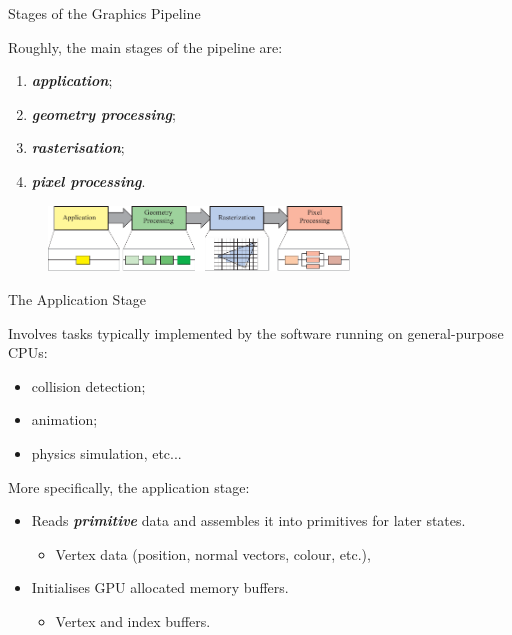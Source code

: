 \documentclass{beamer}
\newcommand{\emphbf}[1]{\textbf{\emph{#1}}}
\begin{document}
\begin{frame}{Stages of the Graphics Pipeline}

	Roughly, the main stages of the pipeline are:

	\begin{enumerate}
		\item \emphbf{application};
		\item \emphbf{geometry processing};
		\item \emphbf{rasterisation};
		\item \emphbf{pixel processing}.
	\end{enumerate}

	\vskip 1cm

	\begin{figure}[t]
		\includegraphics[width=8cm]{main-pipeline}
		\centering
	\end{figure}

\end{frame}

\begin{frame}{The Application Stage}

	Involves tasks typically implemented by the software running on general-purpose CPUs:

	\begin{itemize}
		\item collision detection;
		\item animation;
		\item physics simulation, etc...
	\end{itemize}

	\vskip 1cm

	More specifically, the application stage:

	\begin{itemize}
		\item Reads \emphbf{primitive} data and assembles it into primitives for later states.
		\begin{itemize}
			\item Vertex data (position, normal vectors, colour, etc.),
		\end{itemize}
		\item Initialises GPU allocated memory buffers.
		\begin{itemize}
			\item Vertex and index buffers.
		\end{itemize}
	\end{itemize}

\end{frame}
\end{document}
